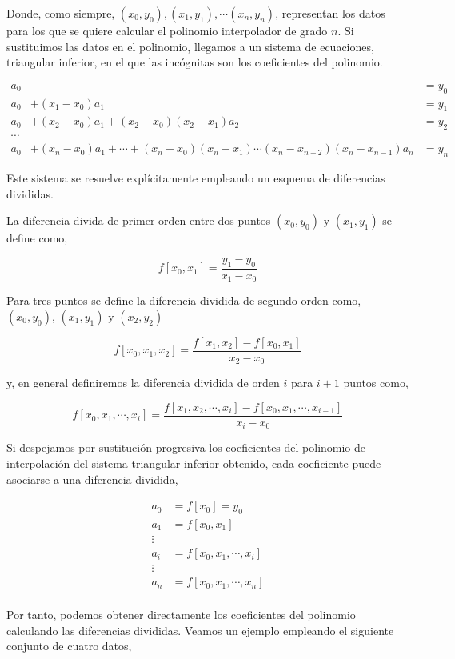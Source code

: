 \begin{paracol}{2}
Donde, como siempre, $(x_0, y_0), (x_1,y_1), \cdots (x_n, y_n)$, representan los datos para los que se quiere calcular el polinomio interpolador de grado $n$. Si sustituimos las datos en el polinomio, llegamos a un sistema de ecuaciones, triangular inferior, en el que las incógnitas son los coeficientes del polinomio.
\end{paracol}
\begin{align*}
a_0&&=y_0\\
a_0&+(x_1-x_0)a_1&=y_1\\
a_0&+(x_2-x_0)a_1+(x_2-x_0)(x_2-x_1)a_2&=y_2\\
\cdots\\
a_0&+(x_n-x_0)a_1+\cdots+(x_n-x_0)(x_n-x_1)\cdots (x_n-x_{n-2})(x_n-x_{n-1})a_n&=y_n
\end{align*}
\begin{paracol}{2}
Este sistema se resuelve explícitamente empleando un esquema de diferencias divididas. 

La diferencia divida de primer orden entre dos puntos $(x_0,y_0)$ y $(x_1,y_1)$ se define como,
\end{paracol}
\begin{equation*}
f\left[x_0,x_1\right]=\frac{y_1-y_0}{x_1-x_0}
\end{equation*}														
\begin{paracol}{2}
Para tres puntos se define la diferencia dividida de segundo orden como, $(x_0,y_0)$, $(x_1,y_1)$ y $(x_2,y_2)$
\end{paracol}
\begin{equation*}
f\left[x_0,x_1,x_2\right]=\frac{f\left[x_1,x_2\right]-f\left[x_0,x_1\right]}{x_2-x_0}
\end{equation*}
\begin{paracol}{2}
y, en general definiremos la diferencia dividida de orden $i$ para $i+1$ puntos como,
\end{paracol}
\begin{equation*}
f\left[x_0,x_1,\cdots,x_i\right]=\frac{f\left[x_1,x_2,\cdots,x_i\right]-f\left[x_0,x_1,\cdots,x_{i-1}\right]}{x_i-x_0}
\end{equation*}																					\begin{paracol}{2}	
Si despejamos por sustitución progresiva los coeficientes del polinomio de interpolación del sistema triangular inferior obtenido, cada coeficiente puede asociarse a una diferencia dividida,
\end{paracol}
\begin{align*}
a_0&=f\left[x_0\right]=y_0\\
a_1&=f\left[x_0,x_1\right]\\
\vdots\\
a_i&=f\left[x_0,x_1,\cdots,x_i\right]\\
\vdots\\
a_n&=f\left[x_0,x_1,\cdots,x_n\right]\\
\end{align*}																					\begin{paracol}{2}			
Por tanto, podemos obtener directamente los coeficientes del polinomio calculando las diferencias divididas. Veamos un ejemplo empleando el siguiente conjunto de cuatro datos,
\end{paracol}

